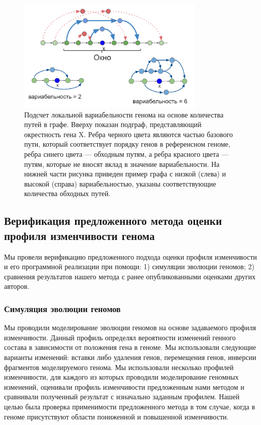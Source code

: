 \begin{figure}[!ht] 
  \center
    \includegraphics[width=0.8\textwidth]{Dissertation/images/complexity_scheme.png}
  \caption{Подсчет локальной вариабельности генома на основе количества путей в графе. Вверху показан подграф, представляющий окрестность гена X. Ребра черного цвета являются частью базового пути, который соответствует порядку генов в референсном геноме, ребра синего цвета --- обходным путям, а ребра красного цвета --- путям, которые не вносят вклад в значение вариабельности. На нижней части рисунка приведен пример графа с низкой (слева) и высокой (справа) вариабельностью, указаны соответствующие количества обходных путей.}
  \label{img:complexity_scheme} 
\end{figure}




\subsection{Верификация предложенного метода оценки профиля изменчивости генома}
Мы провели верификацию предложенного подхода оценки профиля изменчивости и его программной реализации при помощи: 1) симуляции эволюции геномов; 2) сравнения результатов нашего метода с ранее опубликованными оценками других авторов. 

\subsubsection{Симуляция эволюции геномов}
Мы проводили моделирование эволюции геномов на основе задаваемого профиля изменчивости. Данный профиль определял вероятности изменений генного состава в зависимости от положения гена в геноме. Мы использовали следующие варианты изменений: вставки либо удаления генов, перемещения генов, инверсии фрагментов моделируемого генома. Мы использовали несколько профилей изменчивости, для каждого из которых проводили моделирование геномных изменений, оценивали профиль изменчивости предложенным нами методом и сравнивали полученный результат с изначально заданным профилем. Нашей целью была проверка применимости предложенного метода в том случае, когда в геноме присутствуют области пониженной и повышенной изменчивости.

